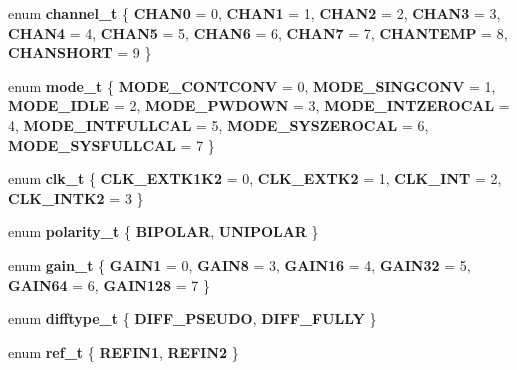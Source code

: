 \begin{DoxyCompactItemize}
\item 
\mbox{\label{classAD7193_a665c9b5d15057c8ceb8f67ce9fb0cdf9}} 
enum {\bfseries channel\+\_\+t} \{ \newline
{\bfseries C\+H\+A\+N0} = 0, 
{\bfseries C\+H\+A\+N1} = 1, 
{\bfseries C\+H\+A\+N2} = 2, 
{\bfseries C\+H\+A\+N3} = 3, 
\newline
{\bfseries C\+H\+A\+N4} = 4, 
{\bfseries C\+H\+A\+N5} = 5, 
{\bfseries C\+H\+A\+N6} = 6, 
{\bfseries C\+H\+A\+N7} = 7, 
\newline
{\bfseries C\+H\+A\+N\+T\+E\+MP} = 8, 
{\bfseries C\+H\+A\+N\+S\+H\+O\+RT} = 9
 \}
\item 
\mbox{\label{classAD7193_a57cf33f5cfeef5051b00dca5dcafa262}} 
enum {\bfseries mode\+\_\+t} \{ \newline
{\bfseries M\+O\+D\+E\+\_\+\+C\+O\+N\+T\+C\+O\+NV} = 0, 
{\bfseries M\+O\+D\+E\+\_\+\+S\+I\+N\+G\+C\+O\+NV} = 1, 
{\bfseries M\+O\+D\+E\+\_\+\+I\+D\+LE} = 2, 
{\bfseries M\+O\+D\+E\+\_\+\+P\+W\+D\+O\+WN} = 3, 
\newline
{\bfseries M\+O\+D\+E\+\_\+\+I\+N\+T\+Z\+E\+R\+O\+C\+AL} = 4, 
{\bfseries M\+O\+D\+E\+\_\+\+I\+N\+T\+F\+U\+L\+L\+C\+AL} = 5, 
{\bfseries M\+O\+D\+E\+\_\+\+S\+Y\+S\+Z\+E\+R\+O\+C\+AL} = 6, 
{\bfseries M\+O\+D\+E\+\_\+\+S\+Y\+S\+F\+U\+L\+L\+C\+AL} = 7
 \}
\item 
\mbox{\label{classAD7193_a01a3497c494fa903b8a02301683cd243}} 
enum {\bfseries clk\+\_\+t} \{ {\bfseries C\+L\+K\+\_\+\+E\+X\+T\+K1\+K2} = 0, 
{\bfseries C\+L\+K\+\_\+\+E\+X\+T\+K2} = 1, 
{\bfseries C\+L\+K\+\_\+\+I\+NT} = 2, 
{\bfseries C\+L\+K\+\_\+\+I\+N\+T\+K2} = 3
 \}
\item 
\mbox{\label{classAD7193_a75e3632982027f6489855ec90c64e33a}} 
enum {\bfseries polarity\+\_\+t} \{ {\bfseries B\+I\+P\+O\+L\+AR}, 
{\bfseries U\+N\+I\+P\+O\+L\+AR}
 \}
\item 
\mbox{\label{classAD7193_adf8a372c583bb595dbd90a03a57d2b62}} 
enum {\bfseries gain\+\_\+t} \{ \newline
{\bfseries G\+A\+I\+N1} = 0, 
{\bfseries G\+A\+I\+N8} = 3, 
{\bfseries G\+A\+I\+N16} = 4, 
{\bfseries G\+A\+I\+N32} = 5, 
\newline
{\bfseries G\+A\+I\+N64} = 6, 
{\bfseries G\+A\+I\+N128} = 7
 \}
\item 
\mbox{\label{classAD7193_aec2d4a0e2b879dd2d81236cb9489a6f9}} 
enum {\bfseries difftype\+\_\+t} \{ {\bfseries D\+I\+F\+F\+\_\+\+P\+S\+E\+U\+DO}, 
{\bfseries D\+I\+F\+F\+\_\+\+F\+U\+L\+LY}
 \}
\item 
\mbox{\label{classAD7193_ad79b77e0bb1690fd1bc34faba1fa5e8d}} 
enum {\bfseries ref\+\_\+t} \{ {\bfseries R\+E\+F\+I\+N1}, 
{\bfseries R\+E\+F\+I\+N2}
 \}
\end{DoxyCompactItemize}
